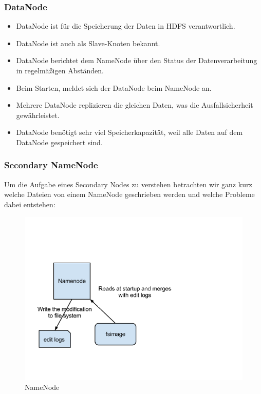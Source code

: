 \subsubsection{DataNode}
\begin{itemize}
\item DataNode ist für die Speicherung der Daten in HDFS verantwortlich.
\item DataNode ist auch als Slave-Knoten bekannt.
\item DataNode berichtet dem NameNode über den Status der Datenverarbeitung in regelmäßigen Abständen. 
\item Beim Starten, meldet sich der DataNode beim NameNode an.
\item Mehrere DataNode replizieren die gleichen Daten, was die Ausfallsicherheit gewährleistet.
\item DataNode benötigt sehr viel Speicherkapazität, weil alle Daten auf dem DataNode gespeichert sind.
\end{itemize}
\cite{nameNode}
\subsubsection{Secondary NameNode}
Um die Aufgabe eines Secondary Nodes zu verstehen betrachten wir ganz kurz welche Dateien von einem NameNode geschrieben werden und welche Probleme dabei entstehen:
\begin{figure}
	\centering
	\includegraphics[width=1.0\textwidth]{images/namenode.png}
	\caption{NameNode}
	\label{img:grafik-nameNode}
\end{figure}


